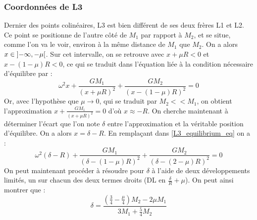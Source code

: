 \documentclass[12pt]{article}
\theoremstyle{definition}
\theoremstyle{definition}
\begin{document}
	
	\subsubsection{Coordonnées de L3}
	Dernier des points colinéaires, L3 est bien différent de ses deux frères L1 et L2. Ce point se positionne de l'autre côté de $M_1$ par rapport à $M_2$, et se situe, comme l'on va le voir, environ à la même distance de $M_1$ que $M_2$.
	On a alors $x \in \interval[open]{-\infty}{-\mu}$. Sur cet intervalle, on se retrouve avec $x+\mu R<0$ et $x-(1-\mu)R<0$, ce qui se traduit dans l'équation liée à la condition nécessaire d'équilibre par :
	\begin{equation}
		\label{L3_equilibrium_eq}
		\omega^2x + \frac{GM_1}{(x+\mu R)^2} + \frac{GM_2}{(x-(1-\mu)R)^2} = 0
	\end{equation}
	Or, avec l'hypothèse que $\mu \to 0$, qui se traduit par $M_2 << M_1$, on obtient l'approximation $x + \frac{GM_1}{(x+\mu R)^2}=0$ d'où $x \approx -R$. On cherche maintenant à déterminer l'écart que l'on note $\delta$ entre l'approximation et la véritable position d'équilibre. On a alors $x = \delta-R$. En remplaçant dans \ref{L3_equilibrium_eq} on a :
	\begin{equation}
		\omega^2(\delta-R) + \frac{GM_1}{(\delta-(1-\mu)R)^2}+\frac{GM_2}{(\delta-(2-\mu)R)^2} = 0
	\end{equation}
	On peut maintenant procéder à résoudre pour $\delta$ à l'aide de deux développements limités, un sur chacun des deux termes droits (DL en $\frac{\delta}{R}+\mu$). On peut ainsi montrer que :
	\begin{equation}
		\delta = \frac{(\frac{3}{4}-\frac{\mu}{4})M_2-2\mu M_1}{3M_1+\frac{5}{4}M_2}
	\end{equation}
	
	
\end{document}

